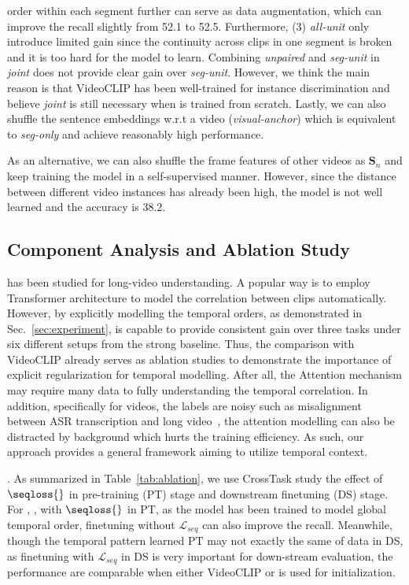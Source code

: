 order within each segment further can serve as data augmentation, which can improve the recall slightly from 52.1 to 52.5. Furthermore, (3) 
\textit{all-unit} only introduce limited gain since the continuity across clips in one segment is broken and it is too hard for the model to learn. Combining \textit{unpaired} and \textit{seg-unit} in \textit{joint} does not provide clear gain over \textit{seg-unit}. However, we think the main reason is that VideoCLIP has been well-trained for instance discrimination and believe \textit{joint} is still necessary when \approach{} is trained from scratch.
Lastly, we can also shuffle the sentence embeddings w.r.t a video (\textit{visual-anchor}) which is equivalent to \textit{seg-only} and achieve reasonably high performance.

 As an alternative, we can also shuffle the frame features of other videos as $\mathbf{S}_n$ and keep training the model in a self-supervised manner. 
However, since the distance between different video instances has already been high, the model is not well learned and the accuracy is 38.2. 

\subsection{Component Analysis and Ablation Study}\label{sec:ablation}

 has been studied for long-video understanding. A popular way is to employ Transformer architecture to model the correlation between clips automatically.
However, by explicitly modelling the temporal orders, as demonstrated in Sec.~\ref{sec:experiment}, \approach{} is capable to provide consistent gain over three tasks under six different setups from the strong baseline.
Thus, the comparison with VideoCLIP already serves as ablation studies to demonstrate the importance of explicit regularization for temporal modelling.
After all, the Attention mechanism may require many data to fully understanding the temporal correlation. 
In addition, specifically for videos, the labels are noisy such as misalignment between ASR transcription and long video~\citep{miech2020end}, the attention modelling can also be distracted by background which hurts the training efficiency.
As such, our approach provides a general framework aiming to utilize temporal context.

. As summarized in Table~\ref{tab:ablation}, we use CrossTask study the effect of $\seqloss{}$ in pre-training (PT) stage and downstream finetuning (DS) stage. 
For \approach{}, \ie, with $\seqloss{}$ in PT, as the model has been trained to model global temporal order, finetuning without $\mathcal{L}_{seq}$ can also improve the recall.
Meanwhile, though the temporal pattern learned PT may not exactly the same of data in DS, as finetuning with $\mathcal{L}_{seq}$ in DS is very important for down-stream evaluation, the performance are comparable when either VideoCLIP or \approach{} is used for initialization. 

